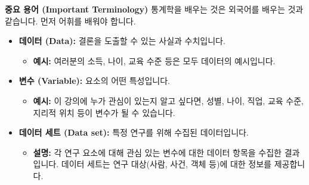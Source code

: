 \documentclass[11pt,a4paper]{article}
\begin{document}
\begin{summarybox}
\textbf{중요 용어 (Important Terminology)}
통계학을 배우는 것은 외국어를 배우는 것과 같습니다. 먼저 어휘를 배워야 합니다.
\begin{itemize}
    \item \textbf{데이터 (Data):} 결론을 도출할 수 있는 사실과 수치입니다.
    \begin{itemize}
        \item \textbf{예시:} 여러분의 소득, 나이, 교육 수준 등은 모두 데이터의 예시입니다.
    \end{itemize}
    \item \textbf{변수 (Variable):} 요소의 어떤 특성입니다.
    \begin{itemize}
        \item \textbf{예시:} 이 강의에 누가 관심이 있는지 알고 싶다면, 성별, 나이, 직업, 교육 수준, 지리적 위치 등이 변수가 될 수 있습니다.
    \end{itemize}
    \item \textbf{데이터 세트 (Data set):} 특정 연구를 위해 수집된 데이터입니다.
    \begin{itemize}
        \item \textbf{설명:} 각 연구 요소에 대해 관심 있는 변수에 대한 데이터 항목을 수집한 결과입니다. 데이터 세트는 연구 대상(사람, 사건, 객체 등)에 대한 정보를 제공합니다.
    \end{itemize}
\end{itemize}
\end{summarybox}
\end{document}
